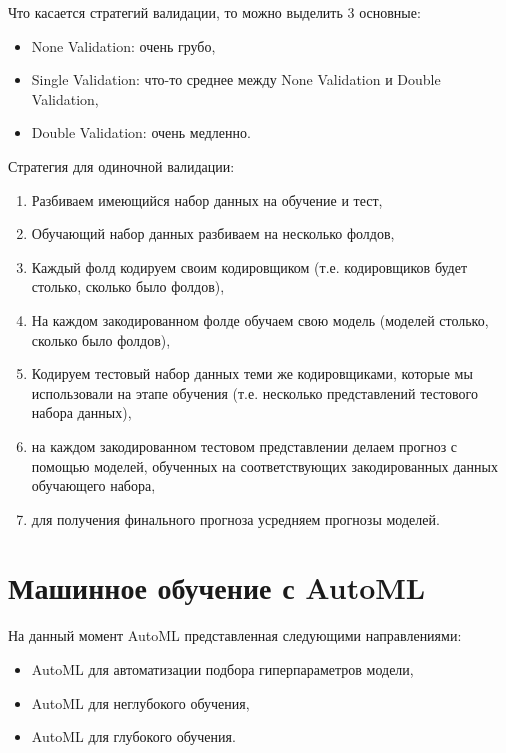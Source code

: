 \documentclass[%
	11pt,
	a4paper,
	utf8,
		]{article}
\begin{document}
Что касается стратегий валидации, то можно выделить 3 основные:
\begin{itemize}
	\item None Validation: очень грубо,
	
	\item Single Validation: что-то среднее между None Validation и Double Validation,
	
	\item Double Validation: очень медленно.
\end{itemize}

\vspace*{2mm}
Стратегия для одиночной валидации:
\begin{enumerate}
	\item Разбиваем имеющийся набор данных на обучение и тест,
	
	\item Обучающий набор данных разбиваем на несколько фолдов,
	
	\item Каждый фолд кодируем своим кодировщиком (т.е. кодировщиков будет столько, сколько было фолдов),
	
	\item На каждом закодированном фолде обучаем свою модель (моделей столько, сколько было фолдов),
	
	\item Кодируем тестовый набор данных теми же кодировщиками, которые мы использовали на этапе обучения (т.е. несколько представлений тестового набора данных),
	
	\item на каждом закодированном тестовом представлении делаем прогноз с помощью моделей, обученных на соответствующих закодированных данных обучающего набора,
	
	\item для получения финального прогноза усредняем прогнозы моделей.
\end{enumerate}




\section{Машинное обучение с AutoML}

На данный момент AutoML представленная следующими направлениями:
\begin{itemize}
	\item AutoML для автоматизации подбора гиперпараметров модели,
	
	\item AutoML для неглубокого обучения,
	
	\item AutoML для глубокого обучения.
\end{itemize}
\end{document}
